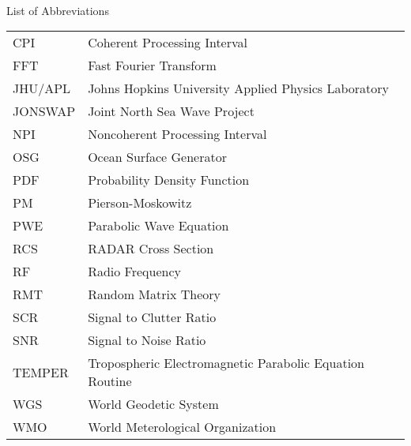 

\renewcommand{\baselinestretch}{1}
\small\normalsize
\hbox{\ }

\vspace{-4em}

\begin{center}
\large{List of Abbreviations}
\end{center} 

\vspace{3pt}

\begin{supertabular}{ll}
CPI & Coherent Processing Interval \\
FFT & Fast Fourier Transform \\
JHU/APL & Johns Hopkins University Applied Physics Laboratory \\
JONSWAP & Joint North Sea Wave Project\\
NPI & Noncoherent Processing Interval \\
OSG & Ocean Surface Generator \\
PDF & Probability Density Function \\
PM & Pierson-Moskowitz \\
PWE & Parabolic Wave Equation \\
RCS & RADAR Cross Section \\
RF & Radio Frequency \\
RMT & Random Matrix Theory \\
SCR & Signal to Clutter Ratio \\
SNR & Signal to Noise Ratio\\
TEMPER & Tropospheric Electromagnetic Parabolic Equation Routine \\
WGS & World Geodetic System \\
WMO & World Meterological Organization \\
\end{supertabular}
